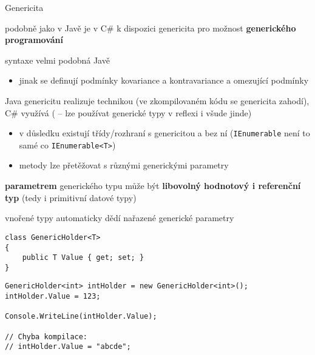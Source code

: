 
\begin{frame}[fragile]
\begin{bitemize}{Genericita}
\item podobně jako v Javě je v C\# k dispozici genericita pro možnost \textbf{generického programování}
\item syntaxe velmi podobná Javě
\begin{itemize}
\item jinak se definují podmínky kovariance a kontravariance a omezující podmínky
\end{itemize}

\item Java genericitu realizuje technikou  (ve zkompilovaném kódu se genericita zahodí), C\# využívá  ( -- lze používat generické typy v reflexi i všude jinde)
\begin{itemize}
\item v důsledku existují třídy/rozhraní s genericitou a bez ní (\lstinline|IEnumerable| není to samé co \lstinline|IEnumerable<T>|)
\item metody lze přetěžovat s různými generickými parametry
\end{itemize}
\item \textbf{parametrem} generického typu může být \textbf{libovolný hodnotový i referenční typ} (tedy i primitivní datové typy)
\item vnořené typy automaticky dědí nařazené generické parametry
\end{bitemize}
\vfill


\end{frame}


\begin{frame}[fragile]
\begin{yesblock}
\begin{lstlisting}
class GenericHolder<T>
{
    public T Value { get; set; }
}
\end{lstlisting}
\end{yesblock}
\vfill
\begin{yesblock}
\begin{lstlisting}
GenericHolder<int> intHolder = new GenericHolder<int>();
intHolder.Value = 123;

Console.WriteLine(intHolder.Value);

// Chyba kompilace:
// intHolder.Value = "abcde";
\end{lstlisting}
\end{yesblock}
\end{frame}



